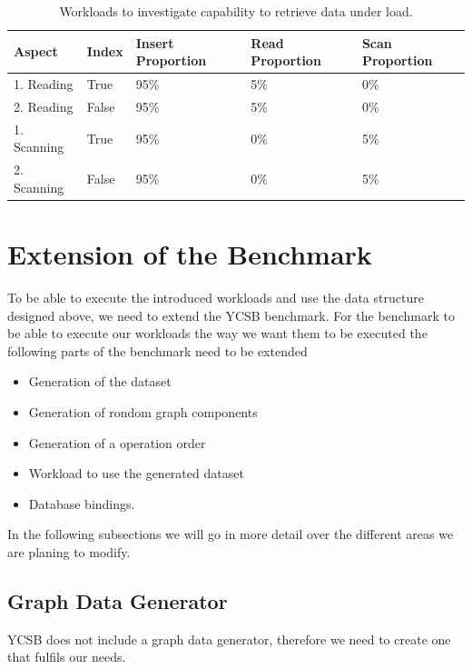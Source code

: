 \begin{table}[!h]
  \begin{minipage}{\textwidth}
    \begin{tabularx}{\textwidth}{ | X | X | X | X | X | }
      \hline
      Aspect & Index & Insert Proportion & Read Proportion & Scan Proportion \\ \hline
      1. Reading & True & 95\% & 5\% & 0\% \\ \hline
      2. Reading & False & 95\% & 5\% & 0\% \\ \hline
      1. Scanning & True & 95\% & 0\% & 5\% \\ \hline
      2. Scanning & False & 95\% & 0\% & 5\% \\ \hline
    \end{tabularx}
  \end{minipage}
  \caption{Workloads to investigate capability to retrieve data under load.}
  \label{tab:retrievingUnderLoad}
\end{table}

\section{Extension of the Benchmark}
\label{ch:design:se:extensionOfTheBenchmark}
To be able to execute the introduced workloads and use the data structure designed above,
we need to extend the YCSB benchmark.
For the benchmark to be able to execute our workloads the way we want them to be executed the following parts of the benchmark need to be extended

\begin{itemize}
  \item Generation of the dataset
  \item Generation of rondom graph components
  \item Generation of a operation order
  \item Workload to use the generated dataset
  \item Database bindings.
\end{itemize}

In the following subsections we will go in more detail over the different areas we are planing to modify.

\subsection{Graph Data Generator}
YCSB does not include a graph data generator,
therefore we need to create one that fulfils our needs.

